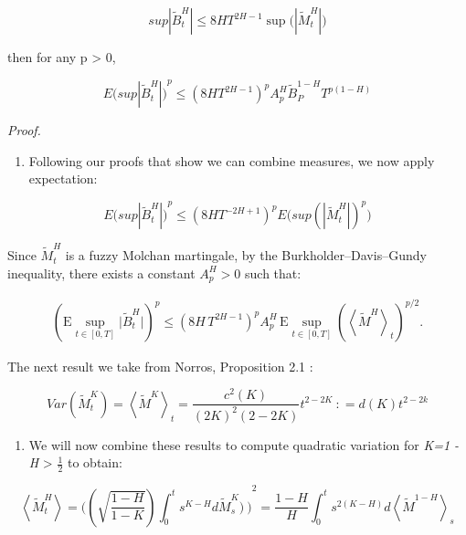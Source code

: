 \documentclass[12pt,a4paper]{report}
\numberwithin{equation}{section}
\begin{document}
\[sup|{\widetilde{B}}_{t}^{H}| \leq 8HT^{2H - 1}\sup{(\left| {\widetilde{M}}_{t}^{H} \right|})\]

then for any p \textgreater{} 0,

\[{{E(sup}\left| {\widetilde{B}}_{t}^{H} \right|)}^{p} \leq {(8HT^{2H - 1})}^{p}A_{p}^{H}{\widetilde{B}}_{P}^{1 - H}T^{p(1 - H)}\]

\emph{Proof.}

\begin{enumerate}
\def\labelenumi{\arabic{enumi}.}
\setcounter{enumi}{4}
\item
  Following our proofs that show we can combine measures, we now apply
  expectation:
\end{enumerate}

\[{{E(sup}\left| {\widetilde{B}}_{t}^{H} \right|)}^{p} \leq {(8HT^{- 2H + 1})}^{p}{E(sup}{{(\left| {\widetilde{M}}_{t}^{H} \right|)}^{p})}\]

Since \({\widetilde{M}}_{t}^{H}\) is a fuzzy Molchan martingale, by the
Burkholder--Davis--Gundy inequality, there exists a constant
\(A_{p}^{H} > 0\) such that:

\begin{equation}
\begin{aligned}
\left(\mathrm{E}\sup_{t\in[0,T]}\bigl|\widetilde{B}_t^{H}\bigr|\right)^{p}
\le \left(8H\,T^{2H-1}\right)^{p} A_{p}^{H}\,
\mathrm{E}\sup_{t\in[0,T]}\left(\left\langle \widetilde{M}^{H}\right\rangle_{t}\right)^{p/2}.
\end{aligned}
\tag{5.1.43}
\end{equation}


The next result we take from Norros, Proposition 2.1 \cite{norros1999elementary_112}:

\[Var\left( {\widetilde{M}}_{t}^{K} \right) = \left\langle {\widetilde{M}}^{K} \right\rangle_{t} = \frac{c^{2}(K)}{(2K)^{2}(2 - 2K)}t^{2 - 2K}\ : = d(K)t^{2 - 2k}\]

\begin{enumerate}
\def\labelenumi{\arabic{enumi}.}
\setcounter{enumi}{5}
\item
  We will now combine these results to compute quadratic variation for
  \emph{K=1 - H} \textgreater{} $\frac{1}{2}$ to obtain:
\end{enumerate}

\[\left\langle {\widetilde{M}}_{t}^{H} \right\rangle = {(\left( \sqrt{\frac{1 - H}{1 - K}} \right)\int_{0}^{t}{s^{K - H}d{\widetilde{M}}_{s\ }^{K})\ )}}^{2} = \frac{1 - H}{H}\int_{0}^{t}{s^{2(K - H)}{d\left\langle {\widetilde{M}}^{1 - H} \right\rangle}_{s}}\]
\end{document}
